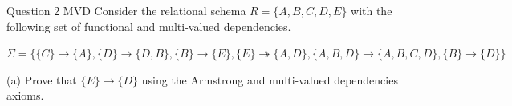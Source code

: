 \begin{frame}[fragile]{Question 2 MVD}
Consider the relational schema $R = \{A,B,C,D,E\}$ with the following set of functional and multi-valued dependencies.\\ \vspace{5pt}

$\Sigma=\{\{C\}\rightarrow\{A\}, \{D\}\rightarrow\{D,B\}, \{B\}\rightarrow\{E\},\{E\}\twoheadrightarrow\{A,D\},\{A,B,D\}\rightarrow\{A,B,C,D\},\{B\}\rightarrow\{D\}\}$\\ \vspace{5pt}

(a) Prove that $\{E\}\rightarrow\{D\}$ using the Armstrong and multi-valued dependencies axioms.\\ \vspace{5pt}

\end{frame}
